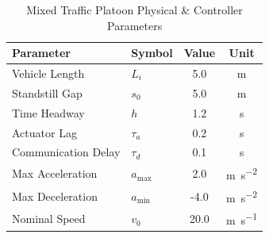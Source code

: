 \begin{table}[t]
\centering
\caption{Mixed Traffic Platoon Physical \& Controller Parameters}
\label{tab:platoon_parameters}
\begin{tabular}{llcc}
\toprule
Parameter & Symbol & Value & Unit \\
\midrule
Vehicle Length & $L_i$ & 5.0 & \si{\meter} \\
Standstill Gap & $s_0$ & 5.0 & \si{\meter} \\
Time Headway & $h$ & 1.2 & \si{\second} \\
Actuator Lag & $\tau_a$ & 0.2 & \si{\second} \\
Communication Delay & $\tau_d$ & 0.1 & \si{\second} \\
Max Acceleration & $a_{\max}$ & 2.0 & \si{\meter\per\second\squared} \\
Max Deceleration & $a_{\min}$ & -4.0 & \si{\meter\per\second\squared} \\
Nominal Speed & $v_0$ & 20.0 & \si{\meter\per\second} \\
\bottomrule
\end{tabular}
\end{table}
